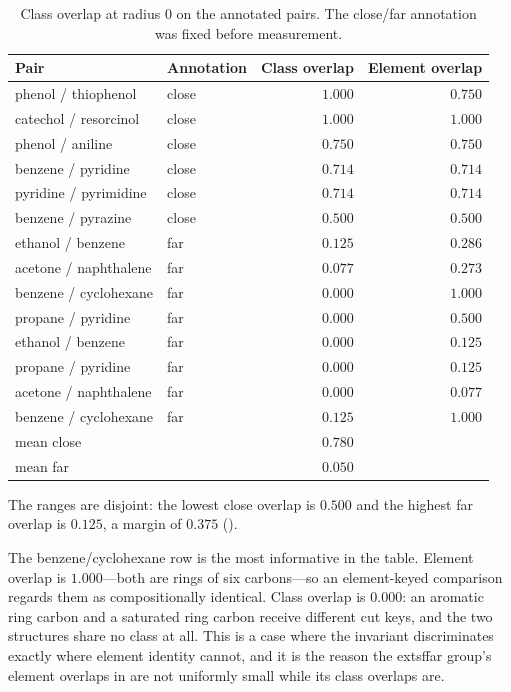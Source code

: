 \documentclass[11pt,twocolumn,a4paper]{article}
\theoremstyle{scthm}
\theoremstyle{definition}
\theoremstyle{remark}
\begin{document}
\begin{table}[htbp]
\centering\small
\caption{Class overlap at radius $0$ on the annotated pairs. The
\textsf{close}/\textsf{far} annotation was fixed before measurement.}
\label{tab:pairs}
\begin{tabular}{@{}llrr@{}}
\toprule
Pair & Annotation & Class overlap & Element overlap\\
\midrule
phenol / thiophenol & close & $1.000$ & $0.750$\\
catechol / resorcinol & close & $1.000$ & $1.000$\\
phenol / aniline & close & $0.750$ & $0.750$\\
benzene / pyridine & close & $0.714$ & $0.714$\\
pyridine / pyrimidine & close & $0.714$ & $0.714$\\
benzene / pyrazine & close & $0.500$ & $0.500$\\
\midrule
ethanol / benzene & far & $0.125$ & $0.286$\\
acetone / naphthalene & far & $0.077$ & $0.273$\\
benzene / cyclohexane & far & $0.000$ & $1.000$\\
propane / pyridine & far & $0.000$ & $0.500$\\
\midrule
ethanol / benzene        & far   & $0.000$ & $0.125$\\
propane / pyridine       & far   & $0.000$ & $0.125$\\
acetone / naphthalene    & far   & $0.000$ & $0.077$\\
benzene / cyclohexane    & far   & $0.125$ & $1.000$\\
\midrule
mean close & & $0.780$ & \\
mean far   & & $0.050$ & \\
\bottomrule
\end{tabular}
\end{table}

The ranges are disjoint: the lowest \textsf{close} overlap is $0.500$ and
the highest \textsf{far} overlap is $0.125$, a margin of $0.375$
().

The benzene/cyclohexane row is the most informative in the table. Element
overlap is $1.000$---both are rings of six carbons---so an element-keyed
comparison regards them as compositionally identical. Class overlap is
$0.000$: an aromatic ring carbon and a saturated ring carbon receive
different cut keys, and the two structures share no class at all. This is
a case where the invariant discriminates exactly where element identity
cannot, and it is the reason the 	extsf{far} group's element overlaps in
 are not uniformly small while its class overlaps are.
\end{document}
